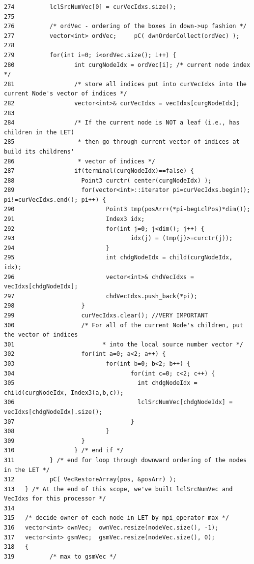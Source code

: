 \begin{verbatim}
274          lclSrcNumVec[0] = curVecIdxs.size();
275 
276          /* ordVec - ordering of the boxes in down->up fashion */
277          vector<int> ordVec;     pC( dwnOrderCollect(ordVec) );
278          
279          for(int i=0; i<ordVec.size(); i++) {
280                 int curgNodeIdx = ordVec[i]; /* current node index */
281                 /* store all indices put into curVecIdxs into the current Node's vector of indices */
282                 vector<int>& curVecIdxs = vecIdxs[curgNodeIdx];
283 
284                 /* If the current node is NOT a leaf (i.e., has children in the LET)
285                  * then go through current vector of indices at build its childrens'
286                  * vector of indices */
287                 if(terminal(curgNodeIdx)==false) {
288                   Point3 curctr( center(curgNodeIdx) );
289                   for(vector<int>::iterator pi=curVecIdxs.begin(); pi!=curVecIdxs.end(); pi++) {
290                          Point3 tmp(posArr+(*pi-begLclPos)*dim());
291                          Index3 idx;
292                          for(int j=0; j<dim(); j++) {
293                                 idx(j) = (tmp(j)>=curctr(j));
294                          }
295                          int chdgNodeIdx = child(curgNodeIdx, idx);
296                          vector<int>& chdVecIdxs = vecIdxs[chdgNodeIdx];
297                          chdVecIdxs.push_back(*pi);
298                   }
299                   curVecIdxs.clear(); //VERY IMPORTANT
300                   /* For all of the current Node's children, put the vector of indices
301                         * into the local source number vector */
302                   for(int a=0; a<2; a++) {
303                          for(int b=0; b<2; b++) {
304                                 for(int c=0; c<2; c++) {
305                                   int chdgNodeIdx = child(curgNodeIdx, Index3(a,b,c));
306                                   lclSrcNumVec[chdgNodeIdx] = vecIdxs[chdgNodeIdx].size();
307                                 }
308                          }
309                   }
310                 } /* end if */
311          } /* end for loop through downward ordering of the nodes in the LET */
312          pC( VecRestoreArray(pos, &posArr) );
313   } /* At the end of this scope, we've built lclSrcNumVec and VecIdxs for this processor */
314   
315   /* decide owner of each node in LET by mpi_operator max */
316   vector<int> ownVec;  ownVec.resize(nodeVec.size(), -1);
317   vector<int> gsmVec;  gsmVec.resize(nodeVec.size(), 0);
318   {
319          /* max to gsmVec */

\end{verbatim}
